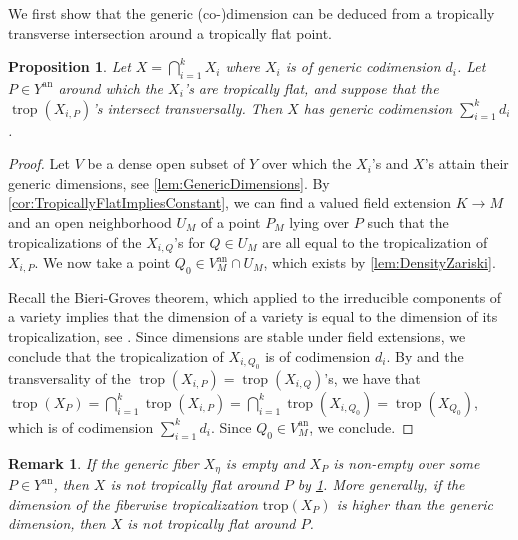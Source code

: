 \documentclass[12pt,reqno,a4paper]{amsart}
\theoremstyle{theoremstyle}
\newtheorem{proposition}[theorem]{Proposition}
\theoremstyle{examplestyle}
\newtheorem{remark}[theorem]{Remark}
\theoremstyle{algorithmstyle}
\newcommand{\an}{{\mathrm{an}}}
\DeclareMathOperator{\trop}{trop}
\DeclareMathOperator{\Trop}{trop}
\begin{document}
We first show that the generic (co-)dimension can be deduced from a tropically transverse intersection around a tropically flat point.
\begin{proposition}\label{pro:DimensionsTransverseIntersections}
    Let $X=\bigcap_{i=1}^k X_{i}$ where $X_i$ is of generic codimension $d_{i}$. Let $P\in Y^{\an}$ around which the $X_{i}$'s are tropically flat, and suppose that the $\trop(X_{i,P})$'s intersect transversally. Then $X$ has generic codimension $\sum_{i=1}^{k}d_{i}$.
\end{proposition}
\begin{proof}
  Let $V$ be a dense open subset of $Y$ over which the $X_{i}$'s and $X$'s attain their generic dimensions, see \cref{lem:GenericDimensions}.
By \cref{cor:TropicallyFlatImpliesConstant}, we can find a valued field extension $K\to M$ and an open neighborhood $U_{M}$ of a point $P_{M}$ lying over $P$ such that the tropicalizations of the $X_{i,Q}$'s for $Q\in U_{M}$ are all equal to the tropicalization of $X_{i,P}$. We now take a point $Q_{0}\in V^{\an}_{M}\cap U_{M}$, which exists by \cref{lem:DensityZariski}.

   Recall the Bieri-Groves theorem, which applied to the irreducible components of a variety implies that the dimension of a variety is equal to the dimension of its tropicalization, see \cite[Theorem 3.3.8]{MS15}.
   Since dimensions are stable under field extensions, we conclude that the tropicalization of $X_{i,Q_{0}}$ is of codimension $d_{i}$.
   By \cite[Theorem 1.2]{OssermanPayne2013} and the transversality of the $\trop(X_{i,P})=\Trop(X_{i,Q})$'s, we have that $\Trop(X_{P})=\bigcap_{i=1}^{k}\Trop(X_{i,P})=\bigcap_{i=1}^{k}\Trop(X_{i,Q_{0}})=\Trop(X_{Q_{0}})$, which is of codimension $\sum_{i=1}^{k}d_{i}$. Since $Q_{0}\in V^{\an}_{M}$, we conclude.
\end{proof}

\begin{remark}
  If the generic fiber $X_\eta$ is empty and $X_P$ is non-empty over some $P\in{Y^{\mathrm{an}}}$, then $X$ is not tropically flat around $P$ by \cref{pro:DimensionsTransverseIntersections}. More generally, if the dimension of the fiberwise tropicalization $\mathrm{trop}(X_{P})$ is higher than the generic dimension, then $X$ is not tropically flat around $P$.
\end{remark}
\end{document}

